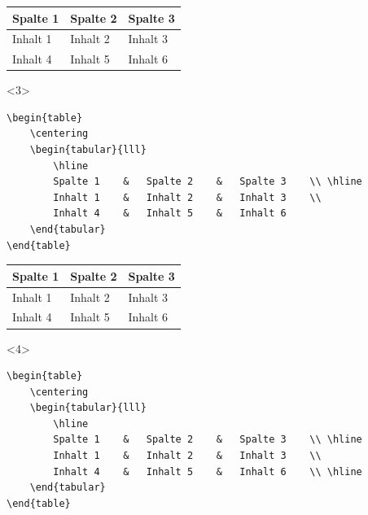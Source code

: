 \documentclass["WS\space 16-17\space -\space LaTeX-Kurs\space -\space Praesentation\space -\space 2.tex"]{subfiles}
\begin{document}
\begin{frame}[fragile]
\begin{onlyenv}
		\Ausgabe
		\begin{outputbox}
			\begin{table}
				\centering
				\begin{tabular}{lll}
					Spalte 1	&	Spalte 2	&	Spalte 3	\\ \hline
					Inhalt 1	&	Inhalt 2	&	Inhalt 3	\\
					Inhalt 4	&	Inhalt 5	&	Inhalt 6	
				\end{tabular}
			\end{table}
		\end{outputbox}
	\end{onlyenv}
	\begin{onlyenv}
		\Code
		\begin{lstlisting}
\begin{table}
	\centering
	\begin{tabular}{lll}
		\hline
		Spalte 1	&	Spalte 2	&	Spalte 3	\\ \hline
		Inhalt 1	&	Inhalt 2	&	Inhalt 3	\\
		Inhalt 4	&	Inhalt 5	&	Inhalt 6	
	\end{tabular}
\end{table}
		\end{lstlisting}
		\Ausgabe
		\begin{outputbox}
			\begin{table}
				\centering
				\begin{tabular}{lll}
					\hline
					Spalte 1	&	Spalte 2	&	Spalte 3	\\ \hline
					Inhalt 1	&	Inhalt 2	&	Inhalt 3	\\
					Inhalt 4	&	Inhalt 5	&	Inhalt 6	
				\end{tabular}
			\end{table}
		\end{outputbox}
	\end{onlyenv}
	\begin{onlyenv}
		\Code
		\begin{lstlisting}
\begin{table}
	\centering
	\begin{tabular}{lll}
		\hline
		Spalte 1	&	Spalte 2	&	Spalte 3	\\ \hline
		Inhalt 1	&	Inhalt 2	&	Inhalt 3	\\
		Inhalt 4	&	Inhalt 5	&	Inhalt 6	\\ \hline
	\end{tabular}
\end{table}
		\end{lstlisting}
		\Ausgabe
		\begin{outputbox}

\end{outputbox}
\end{onlyenv}
\end{frame}
\end{document}
